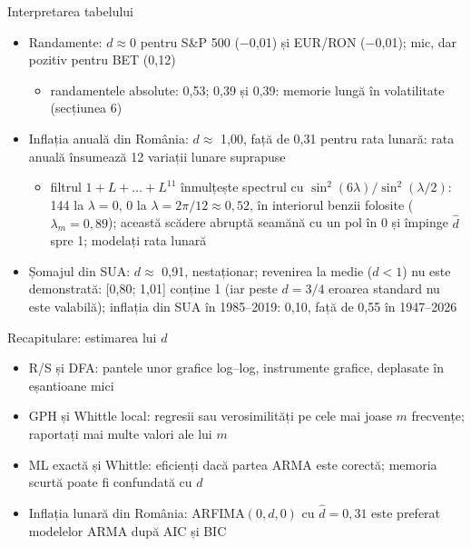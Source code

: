 \begin{frame}{Interpretarea tabelului}
\itemsize{\small}
\begin{itemize}
    \item Randamente: $d \approx 0$ pentru S\&P 500 ($-$0{,}01) și EUR/RON ($-$0{,}01); mic, dar pozitiv pentru BET (0{,}12)
    \begin{itemize}
        \item randamentele absolute: 0{,}53; 0{,}39 și 0{,}39: memorie lungă în volatilitate (secțiunea 6)
    \end{itemize}
    \item Inflația anuală din România: $d \approx$ 1{,}00, față de 0{,}31 pentru rata lunară: rata anuală însumează 12 variații lunare suprapuse
    \begin{itemize}
        \item filtrul $1 + L + \dots + L^{11}$ înmulțește spectrul cu $\sin^2(6\lambda)/\sin^2(\lambda/2)$: 144 la $\lambda = 0$, 0 la $\lambda = 2\pi/12 \approx 0{,}52$, în interiorul benzii folosite ($\lambda_m = 0{,}89$); această scădere abruptă seamănă cu un pol în 0 și împinge $\hat d$ spre 1; modelați rata lunară
    \end{itemize}
    \item Șomajul din SUA: $d \approx$ 0{,}91, nestaționar; revenirea la medie ($d < 1$) nu este demonstrată: [0{,}80; 1{,}01] conține 1 (iar peste $d = 3/4$ eroarea standard nu este valabilă); inflația din SUA în 1985--2019: 0{,}10, față de 0{,}55 în 1947--2026
\end{itemize}
\end{frame}

\begin{frame}{Recapitulare: estimarea lui $d$}
\itemsize{\small}
\begin{itemize}
    \item R/S și DFA: pantele unor grafice log--log, instrumente grafice, deplasate în eșantioane mici
    \item GPH și Whittle local: regresii sau verosimilități pe cele mai joase $m$ frecvențe; raportați mai multe valori ale lui $m$
    \item ML exactă și Whittle: eficienți dacă partea ARMA este corectă; memoria scurtă poate fi confundată cu $d$
    \item Inflația lunară din România: ARFIMA$(0,d,0)$ cu $\hat d = 0{,}31$ este preferat modelelor ARMA după AIC și BIC
\end{itemize}
\end{frame}


